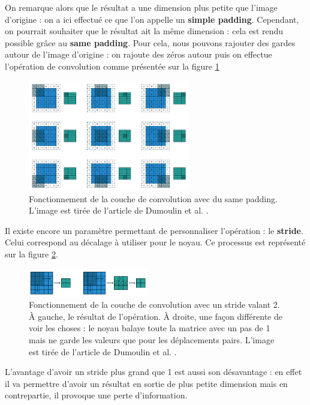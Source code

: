 On remarque alors que le résultat a une dimension plus petite que l'image d'origine : on a ici effectué ce que l'on appelle un \textbf{simple padding}. Cependant, on pourrait souhaiter que le résultat ait la même dimension : cela est rendu possible grâce au \textbf{same padding}. Pour cela, nous pouvons rajouter des gardes autour de l'image d'origine : on rajoute des zéros autour puis on effectue l'opération de convolution comme présentée sur la figure \ref{same_padding}

\begin{figure}[!h]
\centering
\includegraphics[width=200pt]{images/cnn/same_padding.png}
\caption{Fonctionnement de la couche de convolution avec du same padding. L'image est tirée de l'article de Dumoulin et al. \cite{dumoulin_guide_2018}.}
\label{same_padding}
\end{figure}

Il existe encore un paramètre permettant de personnaliser l'opération : le \textbf{stride}. Celui correspond au décalage à utiliser pour le noyau. Ce processus est représenté sur la figure \ref{stride}.

\begin{figure}[!h]
\centering
\includegraphics[width=150pt]{images/cnn/stride.png}
\caption{Fonctionnement de la couche de convolution avec un stride valant 2. À gauche, le résultat de l'opération. À droite, une façon différente de voir les choses : le noyau balaye toute la matrice avec un pas de 1 mais ne garde les valeurs que pour les déplacements pairs. L'image est tirée de l'article de Dumoulin et al. \cite{dumoulin_guide_2018}.}
\label{stride}
\end{figure}
 
L'avantage d'avoir un stride plus grand que 1 est aussi son désavantage : en effet il va permettre d'avoir un résultat en sortie de plus petite dimension mais en contrepartie, il provoque une perte d'information.

